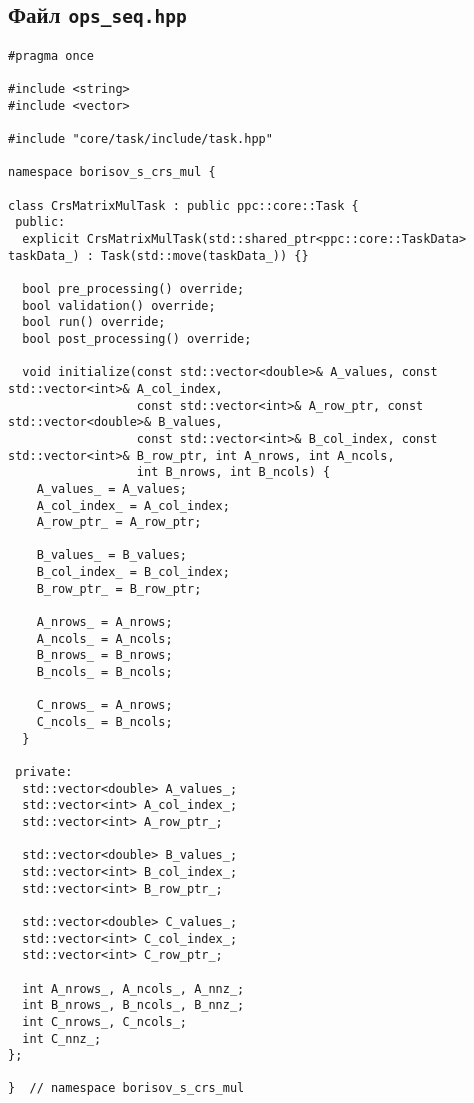 \documentclass[12pt]{article}
\begin{document}
\subsection*{Файл \texttt{ops\_seq.hpp}}

\begin{lstlisting}
#pragma once

#include <string>
#include <vector>

#include "core/task/include/task.hpp"

namespace borisov_s_crs_mul {

class CrsMatrixMulTask : public ppc::core::Task {
 public:
  explicit CrsMatrixMulTask(std::shared_ptr<ppc::core::TaskData> taskData_) : Task(std::move(taskData_)) {}

  bool pre_processing() override;
  bool validation() override;
  bool run() override;
  bool post_processing() override;

  void initialize(const std::vector<double>& A_values, const std::vector<int>& A_col_index,
                  const std::vector<int>& A_row_ptr, const std::vector<double>& B_values,
                  const std::vector<int>& B_col_index, const std::vector<int>& B_row_ptr, int A_nrows, int A_ncols,
                  int B_nrows, int B_ncols) {
    A_values_ = A_values;
    A_col_index_ = A_col_index;
    A_row_ptr_ = A_row_ptr;

    B_values_ = B_values;
    B_col_index_ = B_col_index;
    B_row_ptr_ = B_row_ptr;

    A_nrows_ = A_nrows;
    A_ncols_ = A_ncols;
    B_nrows_ = B_nrows;
    B_ncols_ = B_ncols;

    C_nrows_ = A_nrows;
    C_ncols_ = B_ncols;
  }

 private:
  std::vector<double> A_values_;
  std::vector<int> A_col_index_;
  std::vector<int> A_row_ptr_;

  std::vector<double> B_values_;
  std::vector<int> B_col_index_;
  std::vector<int> B_row_ptr_;

  std::vector<double> C_values_;
  std::vector<int> C_col_index_;
  std::vector<int> C_row_ptr_;

  int A_nrows_, A_ncols_, A_nnz_;
  int B_nrows_, B_ncols_, B_nnz_;
  int C_nrows_, C_ncols_;
  int C_nnz_;
};

}  // namespace borisov_s_crs_mul
\end{lstlisting}

\end{document}
